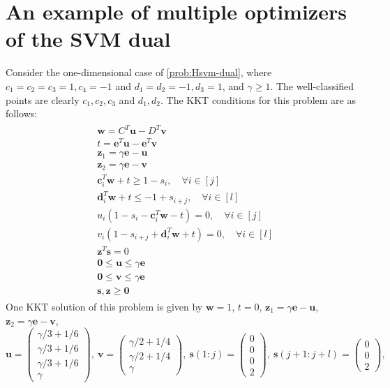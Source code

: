 \documentclass[twoside,11pt]{article}
\newcommand\bz{\bm{0}}
\renewcommand{\c}{\bm{c}}
\renewcommand{\d}{\bm{d}}
\newcommand\s{\bm{s}}
\renewcommand\u{\bm{u}}
\renewcommand\v{\bm{v}}
\newcommand\w{\bm{w}}
\newcommand\z{\bm{z}}
\newcommand\e{\bm{e}}
\begin{document}
\section{An example of multiple optimizers of the SVM dual} \label{app:multiple-min-example}
  Consider the one-dimensional case of \eqref{prob:Hsvm-dual},
  where $c_1 = c_2 = c_3 = 1, c_4 = -1$ and $d_1 = d_2 = -1, d_3 = 1$, and $\gamma \geq 1$. The well-classified points are clearly $c_1,c_2,c_3$ and $d_1,d_2$. The KKT
  conditions for this problem are as follows:
  \begin{align}
    \begin{split} \label{eqn:example-kkt}
      &\w = C^T\u - D^T\v\\
      &t = \e^T\u - \e^T\v\\
      &\z_1 = \gamma\e - \u\\
      &\z_2 = \gamma\e - \v\\
      &\c_i^T\w + t \geq 1 - s_{i},\quad\forall i \in [j]\\
      &\d_i^T\w + t \leq -1 + s_{i+j},\quad\forall i \in [l]\\
      & u_i(1-s_{i} - \c_i^T\w - t) = 0,\quad\forall i \in [j]\\
      & v_i(1-s_{i+j} + \d_i^T\w + t) = 0,\quad\forall i \in [l]\\
      & \z^T\s = 0\\
      &\bz \leq \u \leq \gamma\e\\
      &\bz \leq \v \leq \gamma\e\\
      &\s,\z \geq \bz
    \end{split}
  \end{align}
  One KKT solution of this problem is given by $\w = 1$, $t = 0$, $\z_1 = \gamma\e - \u$, $\z_2 = \gamma\e - \v$,
  \[
    \u = \begin{pmatrix}
      \gamma/3 + 1/6\\
      \gamma/3 + 1/6\\
      \gamma/3 + 1/6\\
      \gamma
    \end{pmatrix},\ 
    \v = \begin{pmatrix}
      \gamma/2 + 1/4\\
      \gamma/2 + 1/4\\
      \gamma
    \end{pmatrix},\ 
    \s(1:j) = \begin{pmatrix}
      0\\
      0\\
      0\\
      2
    \end{pmatrix},\ 
    \s(j+1:j+l) = \begin{pmatrix}
      0\\
      0\\
      2
    \end{pmatrix},
  \]
\end{document}
